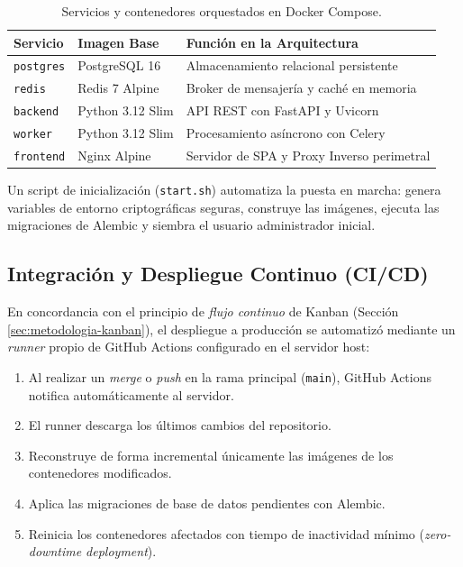\begin{table}[H]
\centering
\begin{tabular}{|l|l|p{7.5cm}|}
\hline
\textbf{Servicio} & \textbf{Imagen Base} & \textbf{Función en la Arquitectura} \\
\hline
\texttt{postgres} & PostgreSQL 16 & Almacenamiento relacional persistente \\
\hline
\texttt{redis} & Redis 7 Alpine & Broker de mensajería y caché en memoria \\
\hline
\texttt{backend} & Python 3.12 Slim & API REST con FastAPI y Uvicorn \\
\hline
\texttt{worker} & Python 3.12 Slim & Procesamiento asíncrono con Celery \\
\hline
\texttt{frontend} & Nginx Alpine & Servidor de SPA y Proxy Inverso perimetral \\
\hline
\end{tabular}
\caption{Servicios y contenedores orquestados en Docker Compose.}
\end{table}

Un script de inicialización (\texttt{start.sh}) automatiza la puesta en marcha: genera variables de entorno criptográficas seguras, construye las imágenes, ejecuta las migraciones de Alembic y siembra el usuario administrador inicial.

\subsection{Integración y Despliegue Continuo (CI/CD)}

En concordancia con el principio de \textit{flujo continuo} de Kanban (Sección \ref{sec:metodologia-kanban}), el despliegue a producción se automatizó mediante un \textit{runner} propio de GitHub Actions configurado en el servidor host:

\begin{enumerate}
    \item Al realizar un \textit{merge} o \textit{push} en la rama principal (\texttt{main}), GitHub Actions notifica automáticamente al servidor.
    \item El runner descarga los últimos cambios del repositorio.
    \item Reconstruye de forma incremental únicamente las imágenes de los contenedores modificados.
    \item Aplica las migraciones de base de datos pendientes con Alembic.
    \item Reinicia los contenedores afectados con tiempo de inactividad mínimo (\textit{zero-downtime deployment}).
\end{enumerate}

